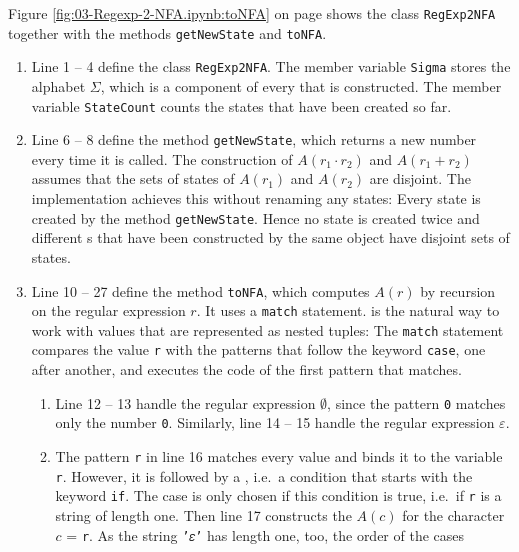 \noindent
Figure \ref{fig:03-Regexp-2-NFA.ipynb:toNFA} on page \pageref{fig:03-Regexp-2-NFA.ipynb:toNFA} shows the class
\texttt{RegExp2NFA} together with the methods \texttt{getNewState} and \texttt{toNFA}.
\begin{enumerate}
\item Line 1 -- 4 define the class \texttt{RegExp2NFA}.  The member variable \texttt{Sigma} stores the alphabet
      $\Sigma$, which is a component of every  that is constructed.  The member variable
      \texttt{StateCount} counts the states that have been created so far.
\item Line 6 -- 8 define the method \texttt{getNewState}, which returns a new number every time it is called.
      The construction of $A(r_1 \cdot r_2)$ and $A(r_1 + r_2)$ assumes that the sets of states of $A(r_1)$ and
      $A(r_2)$ are disjoint.  The implementation achieves this without renaming any states:  Every state is
      created by the method \texttt{getNewState}.  Hence no state is created twice and different
      s that have been constructed by the same object have disjoint sets of states.
\item Line 10 -- 27 define the method \texttt{toNFA}, which computes $A(r)$ by recursion on the regular
      expression $r$.  It uses a \texttt{match} statement.   is the natural way to work with values that are represented as nested tuples:  The
      \texttt{match} statement compares the value \texttt{r} with the patterns that follow the keyword
      \texttt{case}, one after another, and executes the code of the first pattern that matches.
      \begin{enumerate}
      \item Line 12 -- 13 handle the regular expression $\emptyset$, since the pattern \texttt{0} matches only the
            number \texttt{0}.  Similarly, line 14 -- 15 handle the regular expression $\varepsilon$.
      \item The pattern \texttt{r} in line 16 matches every value and binds it to the variable \texttt{r}.
            However, it is followed by a , i.e.~a condition that starts
            with the keyword \texttt{if}.  The case is only chosen if this condition is true, i.e.~if
            \texttt{r} is a string of length one.  Then line 17 constructs the  $A(c)$ for the
            character $c$ = \texttt{r}.  As the string \texttt{'𝜀'} has length one, too, the order of the cases

\end{enumerate}
\end{enumerate}
